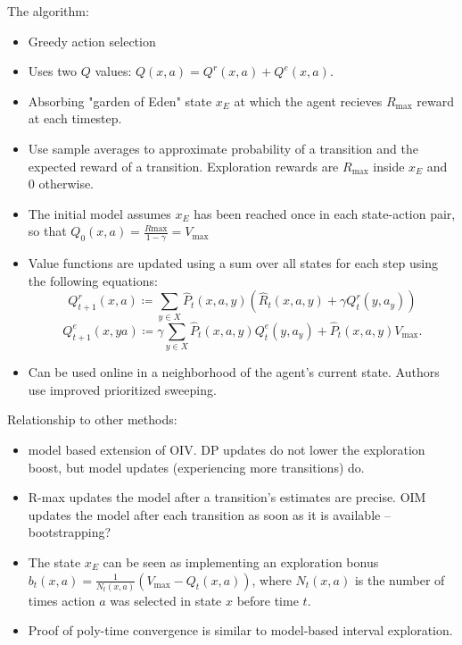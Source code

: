\documentclass[12pt, oneside]{amsart}
\begin{document}
	The algorithm:
	\begin{itemize}
		\item Greedy action selection
		\item Uses two $Q$ values: $Q(x,a) = Q^r(x,a) + Q^e(x,a)$.
		\item Absorbing "garden of Eden" state $x_E$ at which the agent recieves $R_{\text{max}}$ reward at each timestep.
		\item Use sample averages to approximate probability of a transition and the expected reward of a transition. Exploration rewards are $R_{\text{max}}$ inside $x_E$ and $0$ otherwise.
		\item The initial model assumes $x_E$ has been reached once in each state-action pair, so that $Q_0(x, a) = \frac{R{\text{max}}}{1-\gamma} = V_{\text{max}}$
		\item Value functions are updated using a sum over all states for each step using the following equations:
		$$Q_{t+1}^r (x,a) \coloneqq \sum_{y \in X} \hat{P}_t(x,a,y)\left(\hat{R}_t(x,a,y) + \gamma Q_t^r(y, a_y)\right)$$
		$$Q^e_{t+1}(x,ya) \coloneqq \gamma \sum_{y\in X} \hat{P}_t(x,a,y)Q_t^e(y, a_y) + \hat{P}_t(x,a,y)V_{\text{max}}.$$
		\item Can be used online in a neighborhood of the agent's current state. Authors use improved prioritized sweeping.
	\end{itemize}
	
	Relationship to other methods:
	\begin{itemize}
		\item model based extension of OIV. DP updates do not lower the exploration boost, but model updates (experiencing more transitions) do.
		\item R-max updates the model after a transition's estimates are precise. OIM updates the model after each transition as soon as it is available -- bootstrapping?
		\item The state $x_E$ can be seen as implementing an exploration bonus $b_t(x,a) = \frac{1}{N_t(x,a)}\left(V_{\text{max}} - Q_t(x,a)\right)$, where $N_t(x,a)$ is the number of times action $a$ was selected in state $x$ before time $t$.
		\item Proof of poly-time convergence is similar to model-based interval exploration.
	\end{itemize}
	
\end{document}
